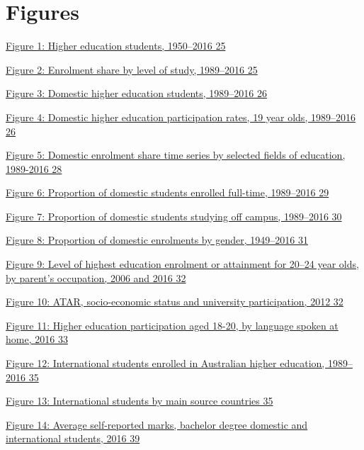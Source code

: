 \documentclass[]{book}
\begin{document}
\hypertarget{section-2}{%
\chapter{}\label{section-2}}

\hypertarget{figures}{%
\chapter{Figures}\label{figures}}

\protect\hyperlink{_Ref395097689}{Figure 1: Higher education students, 1950--2016 25}

\protect\hyperlink{_Ref383095055}{Figure 2: Enrolment share by level of study, 1989--2016 25}

\protect\hyperlink{_Ref383097604}{Figure 3: Domestic higher education students, 1989--2016 26}

\protect\hyperlink{_Ref311634930}{Figure 4: Domestic higher education participation rates, 19 year olds, 1989--2016 26}

\protect\hyperlink{_Ref521518905}{Figure 5: Domestic enrolment share time series by selected fields of education, 1989-2016 28}

\protect\hyperlink{_Ref519873107}{Figure 6: Proportion of domestic students enrolled full-time, 1989--2016 29}

\protect\hyperlink{_Ref521520607}{Figure 7: Proportion of domestic students studying off campus, 1989--2016 30}

\protect\hyperlink{_Ref521520895}{Figure 8: Proportion of domestic enrolments by gender, 1949--2016 31}

\protect\hyperlink{_Ref521083533}{Figure 9: Level of highest education enrolment or attainment for 20--24 year olds, by parent's occupation, 2006 and 2016 32}

\protect\hyperlink{_Ref518647628}{Figure 10: ATAR, socio-economic status and university participation, 2012 32}

\protect\hyperlink{_Ref518647887}{Figure 11: Higher education participation aged 18-20, by language spoken at home, 2016 33}

\protect\hyperlink{_Ref522712886}{Figure 12: International students enrolled in Australian higher education, 1989--2016 35}

\protect\hyperlink{_Ref521521798}{Figure 13: International students by main source countries 35}

\protect\hyperlink{_Ref520361736}{Figure 14: Average self-reported marks, bachelor degree domestic and international students, 2016 39}
\end{document}
